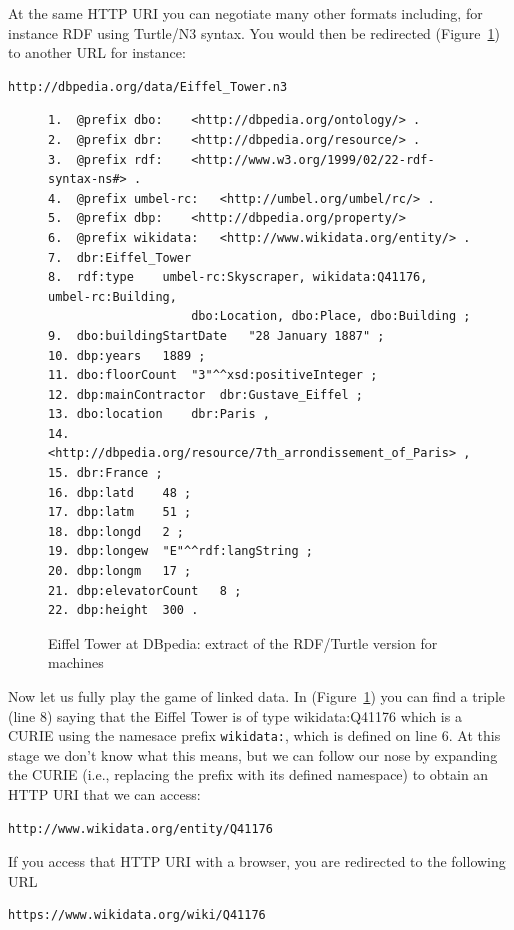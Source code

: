 At the same HTTP URI you can negotiate many other formats including, for
instance RDF using Turtle/N3 syntax. You would then be redirected
(Figure~\ref{fig:ch5.8}) to another URL for instance:

\begin{lstlisting}
http://dbpedia.org/data/Eiffel_Tower.n3
\end{lstlisting}


\begin{figure}
 \begin{lstlisting}
1.	@prefix dbo:	<http://dbpedia.org/ontology/> .
2.	@prefix dbr:	<http://dbpedia.org/resource/> .
3.	@prefix rdf:	<http://www.w3.org/1999/02/22-rdf-syntax-ns#> .
4.	@prefix umbel-rc:	<http://umbel.org/umbel/rc/> .
5.	@prefix dbp:	<http://dbpedia.org/property/>
6.	@prefix wikidata:	<http://www.wikidata.org/entity/> .
7.	dbr:Eiffel_Tower
8.	rdf:type	umbel-rc:Skyscraper, wikidata:Q41176, umbel-rc:Building,
                    dbo:Location, dbo:Place, dbo:Building ;
9.	dbo:buildingStartDate	"28 January 1887" ;
10.	dbp:years	1889 ;
11.	dbo:floorCount	"3"^^xsd:positiveInteger ;
12.	dbp:mainContractor	dbr:Gustave_Eiffel ;
13.	dbo:location	dbr:Paris ,
14.	<http://dbpedia.org/resource/7th_arrondissement_of_Paris> ,
15.	dbr:France ;
16.	dbp:latd	48 ;
17.	dbp:latm	51 ;
18.	dbp:longd	2 ;
19.	dbp:longew	"E"^^rdf:langString ;
20.	dbp:longm	17 ;
21.	dbp:elevatorCount	8 ;
22.	dbp:height	300 .
 \end{lstlisting}
    \caption{Eiffel Tower at DBpedia: extract of the RDF/Turtle version for
machines}
    \label{fig:ch5.8}
\end{figure}

Now let us fully play the game of linked data. In (Figure~\ref{fig:ch5.8}) you can
find a triple (line 8) saying that the Eiffel Tower is of type
wikidata:Q41176 which is a CURIE using the namesace prefix \texttt{wikidata:}, which is defined 
on line 6. At this stage we don't know what this
means, but we can follow our nose by expanding the CURIE (i.e., 
replacing the prefix with its defined  namespace) to obtain an HTTP URI that we
can access:

\begin{lstlisting}
http://www.wikidata.org/entity/Q41176
\end{lstlisting}

If you access that HTTP URI with a browser, you are redirected to the
following URL

\begin{lstlisting}
https://www.wikidata.org/wiki/Q41176
\end{lstlisting}


